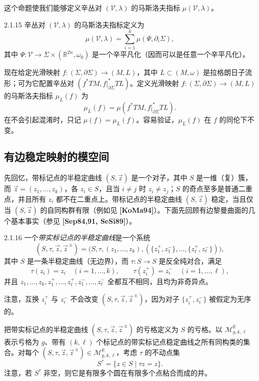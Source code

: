 这个命题使我们能够定义辛丛对 $(\mathcal V,\lambda)$ 的马斯洛夫指标
$\mu(\mathcal V,\lambda)$。

\begin{definition}{2.1.15}\label{def:2-1-15}
辛丛对 $(\mathcal V,\lambda)$ 的马斯洛夫指标定义为
\[
  \mu(\mathcal V,\lambda)
  =\sum_{i=1}^h\mu(\Psi,\partial_i\Sigma),
\]
其中 $\Psi:\mathcal V\to\Sigma\times(\mathbb R^{2n},\omega_0)$ 是一个辛平凡化（因而可以是任意一个辛平凡化）。
\end{definition}

现在给定光滑映射 $f:(\Sigma,\partial\Sigma)\to(M,L)$，其中
$L\subset(M,\omega)$ 是拉格朗日子流形；可为它配置辛丛对
$(f^*TM,f|_{\partial\Sigma}^*TL)$。定义光滑映射
$f:(\Sigma,\partial\Sigma)\to(M,L)$ 的马斯洛夫指标 $\mu_L(f)$ 为
\[
  \mu_L(f)=\mu(f^*TM,f|_{\partial\Sigma}^*TL).
\]
在不会引起混淆时，只记 $\mu(f)=\mu_L(f)$。容易验证，$\mu_L(f)$ 在 $f$ 的同伦下不变。

\subsection{有边稳定映射的模空间}
\label{sec:2-1-2}

先回忆，带标记点的半稳定曲线 $(S,\vec z)$ 是一个对子，其中 $S$ 是一维（复）簇，而
$\vec z=(z_1,\ldots,z_k)$，各 $z_i\in S$，且当 $i\ne j$ 时
$z_i\ne z_j$；$S$ 的奇点至多是普通二重点，并且所有 $z_i$ 都不在二重点上。带标记点的半稳定曲线
$(S,\vec z)$ 稳定，当且仅当 $(S,\vec z)$ 的自同构群有限（例如见 \textbf{[KoMa94]}）。下面先回顾有边黎曼曲面的几个基本事实（参见 \textbf{[Sep84,91, SeSi89]}）。

\begin{definition}{2.1.16}\label{def:2-1-16}
一个\emph{带实标记点的半稳定曲线}是一个系统
\[
  (S,\tau,\vec z,\vec z^{\,\pm})
  =\bigl(S,\tau,(z_1,\ldots,z_k),
    (\{z_1^+,z_1^-\},\ldots,\{z_\ell^+,z_\ell^-\})\bigr),
\]
其中 $S$ 是一条半稳定曲线（无边界），而
$\tau:S\to S$ 是反全纯对合，满足
\[
  \tau(z_i)=z_i\quad(i=1,\ldots,k),
  \qquad
  \tau(z_i^+)=z_i^-\quad(i=1,\ldots,\ell),
\]
并且
$z_1,\ldots,z_k,z_1^+,\ldots,z_\ell^+,z_1^-,\ldots,z_\ell^-$
全都互不相同，且均为非奇异点。
\end{definition}

注意，互换 $z_i^+$ 与 $z_i^-$ 不会改变
$(S,\tau,\vec z,\vec z^{\,\pm})$，因为对子
$\{z_i^+,z_i^-\}$ 被假定为无序的。

把带实标记点的半稳定曲线 $(S,\tau,\vec z,\vec z^{\,\pm})$ 的亏格定义为
$S$ 的亏格。以 $\mathcal M^{\mathbb R}_{g,k,\ell}$ 表示亏格为 $g$、带有
$(k,\ell)$ 个标记点的带实标记点稳定曲线之所有同构类的集合。对每个
$(S,\tau,\vec z,\vec z^{\,\pm})\in\mathcal M^{\mathbb R}_{g,k,\ell}$，考虑
$\tau$ 的不动点集
\[
  S^\tau=\{z\in S\mid\tau z=z\}.
\]
注意，若 $S^\tau$ 非空，则它是有限多个圆在有限多个点粘合而成的并。

